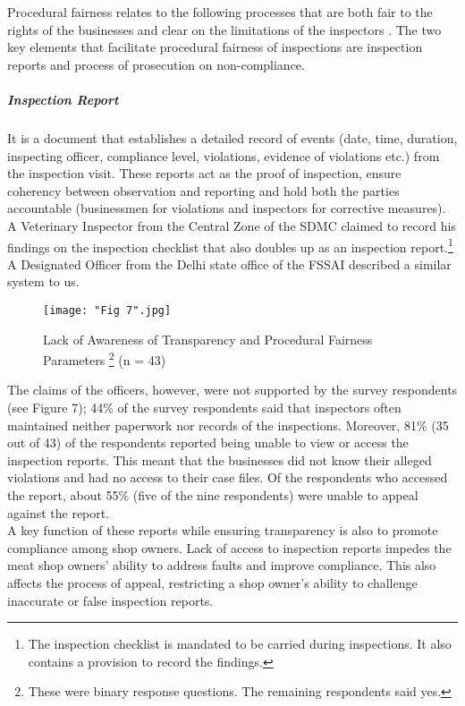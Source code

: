 \documentclass[a4paper, 12pt]{article}
\begin{document}
Procedural fairness relates to the following processes that are both fair to the rights of the businesses and clear on the limitations of the inspectors \parencite{oecdreport}. The two key elements that facilitate procedural fairness of inspections are inspection reports and process of prosecution on non-compliance.\\

\subparagraph{Inspection Report}

It is a document that establishes a detailed record of events (date, time, duration, inspecting officer, compliance level, violations, evidence of violations etc.) from the inspection visit. These reports act as the proof of inspection, ensure coherency between observation and reporting and hold both the parties accountable (businessmen for violations and inspectors for corrective measures). \\

A Veterinary Inspector from the Central Zone of the SDMC claimed to record his findings on the inspection checklist that also doubles up as an inspection report.\footnote{The inspection checklist is mandated to be carried during inspections. It also contains a provision to record the findings.} A Designated Officer from the Delhi state office of the FSSAI described a similar system to us.\\

\begin{figure}[H]
\centering
\texttt{[image: "Fig 7".jpg]}
\caption[Optional Caption]{Lack of Awareness of Transparency and Procedural Fairness Parameters \footnote{ These were binary response questions. The remaining respondents said yes.} (n = 43)}
\end{figure} 

The claims of the officers, however, were not supported by the survey respondents (see Figure 7); 44\% of the survey respondents said that inspectors often maintained neither paperwork nor records of the inspections. Moreover, 81\% (35 out of 43) of the respondents reported being unable to view or access the inspection reports. This meant that the businesses did not know their alleged violations and had no access to their case files. Of the respondents who accessed the report, about 55\% (five of the nine respondents) were unable to appeal against the report. \\

A key function of these reports while ensuring transparency is also to promote compliance among shop owners. Lack of access to inspection reports impedes the meat shop owners’ ability to address faults and improve compliance. This also affects the process of appeal, restricting a shop owner’s ability to challenge inaccurate or false inspection reports.\\
\end{document}
